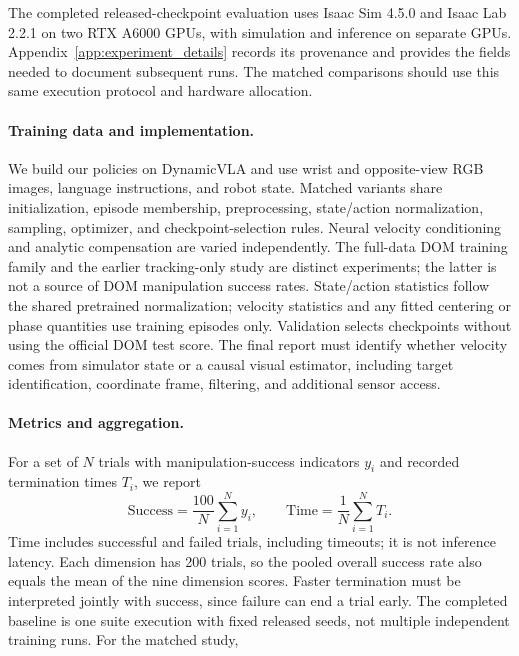 \documentclass[10pt,twocolumn,letterpaper]{article}
\begin{document}
The completed released-checkpoint evaluation uses Isaac Sim 4.5.0 and Isaac Lab
2.2.1 on two RTX A6000 GPUs, with simulation and inference on separate GPUs.
Appendix~\ref{app:experiment_details} records its provenance and provides the
fields needed to document subsequent runs. The matched comparisons should use
this same execution protocol and hardware allocation.

\paragraph{Training data and implementation.}
We build our policies on DynamicVLA and use wrist and opposite-view RGB images,
language instructions, and robot state. Matched variants share initialization,
episode membership, preprocessing, state/action normalization, sampling,
optimizer, and checkpoint-selection rules. Neural velocity conditioning and
analytic compensation are varied independently. The full-data DOM training
family and the earlier tracking-only study are distinct experiments; the latter
is not a source of DOM manipulation success rates.
State/action statistics follow the shared pretrained normalization; velocity
statistics and any fitted centering or phase quantities use training episodes
only. Validation selects checkpoints without using the official DOM test score.
The final report must identify whether velocity comes from simulator state or a
causal visual estimator, including target identification, coordinate frame,
filtering, and additional sensor access.

\paragraph{Metrics and aggregation.}
For a set of $N$ trials with manipulation-success indicators $y_i$ and recorded
termination times $T_i$, we report
\begin{equation}
    \mathrm{Success}=\frac{100}{N}\sum_{i=1}^{N} y_i,
    \qquad
    \mathrm{Time}=\frac{1}{N}\sum_{i=1}^{N} T_i.
    \label{eq:dom_metrics}
\end{equation}
Time includes successful and failed trials, including timeouts; it is not
inference latency. Each dimension has 200 trials, so the pooled overall success
rate also equals the mean of the nine dimension scores. Faster termination
must be interpreted jointly with success, since failure can end a trial early.
The completed baseline is one suite execution with fixed released seeds, not
multiple independent training runs. For the matched study,
\end{document}
